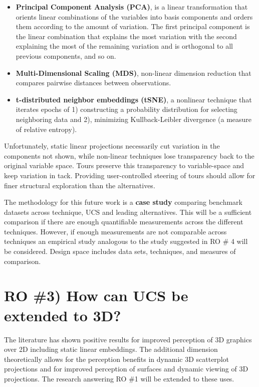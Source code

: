 \documentclass{monashthesis}
\begin{document}
\begin{itemize}
\tightlist
\item
  \textbf{Principal Component Analysis (PCA)}, is a linear
  transformation that orients linear combinations of the variables into
  basis components and orders them according to the amount of variation.
  The first principal component is the linear combination that explains
  the most variation with the second explaining the most of the
  remaining variation and is orthogonal to all previous components, and
  so on.
\item
  \textbf{Multi-Dimensional Scaling (MDS)}, non-linear dimension
  reduction that compares pairwise distances between observations.
\item
  \textbf{t-distributed neighbor embeddings (tSNE)}, a nonlinear
  technique that iterates epochs of 1) constructing a probability
  distribution for selecting neighboring data and 2), minimizing
  Kullback-Leibler divergence (a measure of relative entropy).
\end{itemize}

Unfortunately, static linear projections necessarily cut variation in
the components not shown, while non-linear techniques lose transparency
back to the original variable space. Tours preserve this transparency to
variable-space and keep variation in tack. Providing user-controlled
steering of tours should allow for finer structural exploration than the
alternatives.

The methodology for this future work is a \textbf{case study} comparing
benchmark datasets across technique, UCS and leading alternatives. This
will be a sufficient comparison if there are enough quantifiable
measurements across the different techniques. However, if enough
measurements are not comparable across techniques an empirical study
analogous to the study suggested in RO \# 4 will be considered. Design
space includes data sets, techniques, and measures of comparison.

\section{RO \#3) How can UCS be extended to
3D?}\label{ro-3-how-can-ucs-be-extended-to-3d}

The literature has shown positive results for improved perception of 3D
graphics over 2D including static linear embeddings. The additional
dimension theoretically allows for the perception benefits in dynamic 3D
scatterplot projections and for improved perception of surfaces and
dynamic viewing of 3D projections. The research answering RO \#1 will be
extended to these uses.
\end{document}
